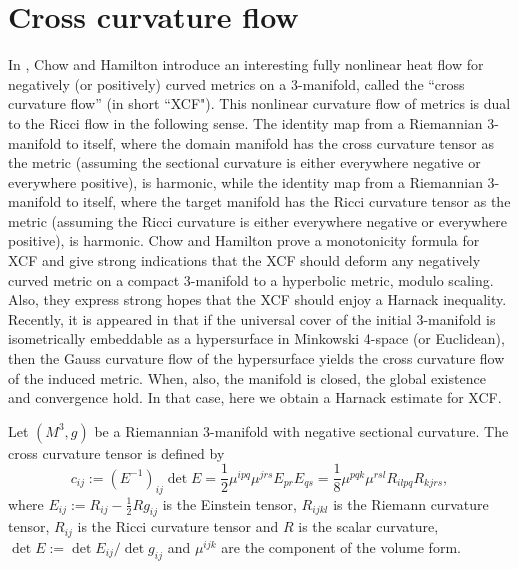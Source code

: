 \section{Cross curvature flow}
In \cite{ChowHamilton:/2004}, Chow and Hamilton introduce an interesting fully nonlinear heat flow for negatively (or positively) curved metrics on a 3-manifold, called the ``cross curvature flow'' (in short ``XCF"). This nonlinear curvature flow of metrics is dual to the Ricci flow in the following sense. The identity map from a Riemannian 3-manifold to itself, where the domain manifold has the cross curvature tensor as the metric (assuming the sectional curvature is either everywhere negative or everywhere positive), is harmonic, while the identity map from a Riemannian 3-manifold to itself, where the target manifold has the  Ricci curvature tensor as the metric (assuming the Ricci curvature is either everywhere negative or everywhere positive), is harmonic. Chow and Hamilton prove a monotonicity formula for XCF and give strong indications that the XCF should deform any negatively curved metric on a compact 3-manifold to a hyperbolic metric, modulo scaling. Also, they express strong hopes that the XCF should enjoy a Harnack inequality. Recently, it is appeared in \cite{AndrewsChenFangMcCoy:/2015} that if the universal cover of the initial 3-manifold is isometrically embeddable as a hypersurface in Minkowski 4-space (or  Euclidean), then the Gauss curvature flow of the hypersurface yields the cross curvature flow of the induced metric. When, also, the manifold is closed, the global existence and convergence hold. In that case, here we obtain a Harnack estimate for XCF.


Let $(M^3,g)$ be a Riemannian 3-manifold with negative sectional curvature. The cross curvature tensor is defined by
\[c_{ij}:=(E^{-1})_{ij}\det E=\frac{1}{2}\mu^{ipq}\mu^{jrs}E_{pr}E_{qs}=\frac{1}{8}\mu^{pqk}\mu^{rsl}R_{ilpq}R_{kjrs},\]
where $E_{ij}:=R_{ij}-\frac{1}{2}Rg_{ij}$ is the Einstein tensor, $R_{ijkl}$ is the Riemann curvature tensor, $R_{ij}$ is the Ricci curvature tensor and $R$ is the scalar curvature, $\det E:=\det E_{ij}/\det g_{ij}$ and $\mu^{ijk}$ are the component of the volume form.

